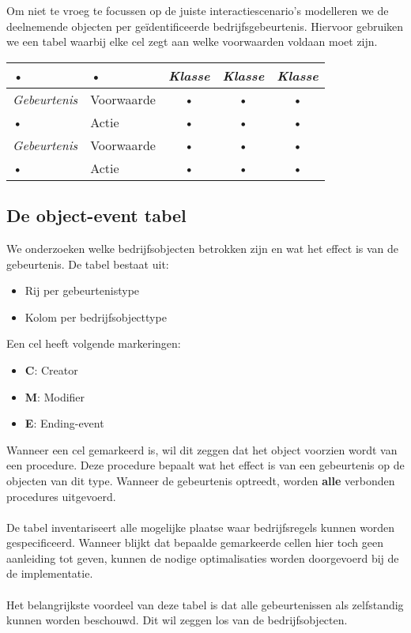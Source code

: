 \documentclass[../../main.tex]{subfiles}
\begin{document}
Om niet te vroeg te focussen op de juiste interactiescenario's modelleren we de deelnemende objecten per ge\"identificeerde bedrijfsgebeurtenis. Hiervoor gebruiken we een tabel waarbij elke cel zegt aan welke voorwaarden voldaan moet zijn.
\begin{center}
\begin{tabular}{|l|l|c|c|c|}
\hline
• & • & \textit{Klasse} & \textit{Klasse} & \textit{Klasse} \\
\hline
\textit{Gebeurtenis} & Voorwaarde & • & • & • \\
\hline
• & Actie & • & • & • \\
\hline
\textit{Gebeurtenis} & Voorwaarde & • & • & • \\
\hline
• & Actie & • & • & • \\
\hline
\end{tabular}
\end{center}


\subsection{De object-event tabel}
We onderzoeken welke bedrijfsobjecten betrokken zijn en wat het effect is van de gebeurtenis. De tabel bestaat uit:
\begin{itemize}
	\item Rij per gebeurtenistype
	\item Kolom per bedrijfsobjecttype
\end{itemize}
Een cel heeft volgende markeringen:
\begin{itemize}
	\item \textbf{C}: Creator
	\item \textbf{M}: Modifier
	\item \textbf{E}: Ending-event
\end{itemize}
Wanneer een cel gemarkeerd is, wil dit zeggen dat het object voorzien wordt van een procedure. Deze procedure bepaalt wat het effect is van een gebeurtenis op de objecten van dit type. Wanneer de gebeurtenis optreedt, worden \textbf{alle} verbonden procedures uitgevoerd.\\
\\
De tabel inventariseert alle mogelijke plaatse waar bedrijfsregels kunnen worden gespecificeerd. Wanneer blijkt dat bepaalde gemarkeerde cellen hier toch geen aanleiding tot geven, kunnen de nodige optimalisaties worden doorgevoerd bij de de implementatie.\\
\\
Het belangrijkste voordeel van deze tabel is dat alle gebeurtenissen als zelfstandig kunnen worden beschouwd. Dit wil zeggen los van de bedrijfsobjecten.
\end{document}
